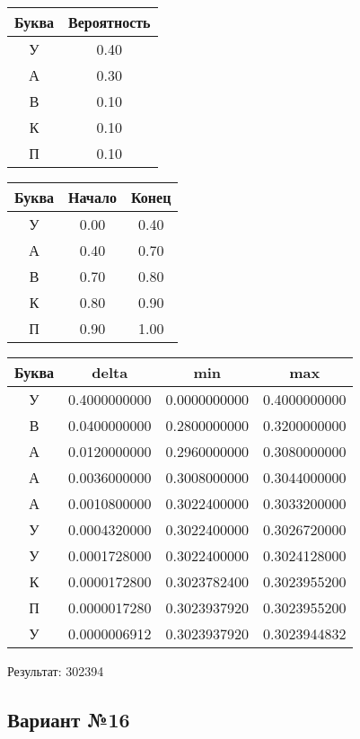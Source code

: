 \documentclass[a4paper, 12pt]{article}
\begin{document}
\begin{center}
 \begin{tabular}{ |c|c| } 
  \hline
     Буква & Вероятность \\ \hline
У & 0.40\\\hline
А & 0.30\\\hline
В & 0.10\\\hline
К & 0.10\\\hline
П & 0.10
\\ \hline \end{tabular}
\end{center}
\begin{center}
 \begin{tabular}{ |c|c|c| } 
  \hline
     Буква & Начало & Конец \\ \hline
У & 0.00 & 0.40\\\hline
А & 0.40 & 0.70\\\hline
В & 0.70 & 0.80\\\hline
К & 0.80 & 0.90\\\hline
П & 0.90 & 1.00
\\ \hline \end{tabular}
\end{center}
\begin{center}
 \begin{tabular}{ |c|c|c|c| } 
  \hline
     Буква & delta & min & max \\ \hline
У & 0.4000000000 & 0.0000000000 & 0.4000000000\\\hline
В & 0.0400000000 & 0.2800000000 & 0.3200000000\\\hline
А & 0.0120000000 & 0.2960000000 & 0.3080000000\\\hline
А & 0.0036000000 & 0.3008000000 & 0.3044000000\\\hline
А & 0.0010800000 & 0.3022400000 & 0.3033200000\\\hline
У & 0.0004320000 & 0.3022400000 & 0.3026720000\\\hline
У & 0.0001728000 & 0.3022400000 & 0.3024128000\\\hline
К & 0.0000172800 & 0.3023782400 & 0.3023955200\\\hline
П & 0.0000017280 & 0.3023937920 & 0.3023955200\\\hline
У & 0.0000006912 & 0.3023937920 & 0.3023944832
\\ \hline \end{tabular}
\end{center}
Результат: 302394
\pagebreak
\subsection{Вариант №16}
\end{document}
